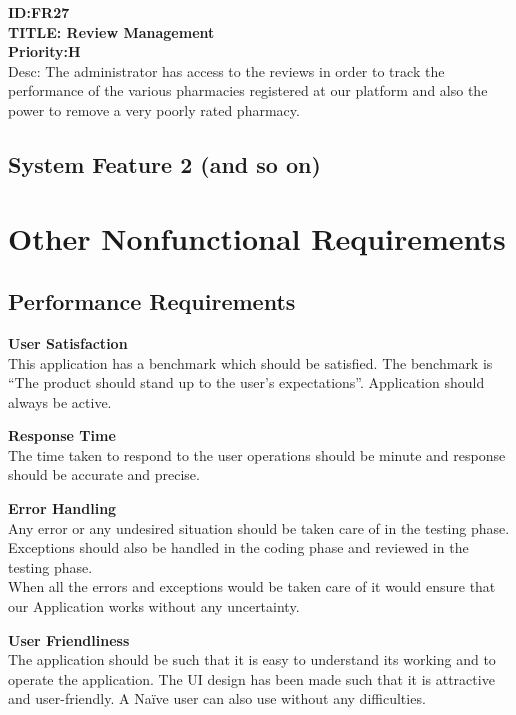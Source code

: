 \documentclass{scrreprt}
\begin{document}
\textbf{ID:FR27}  \\
\textbf{TITLE: Review Management}  \\
\textbf{Priority:H}   \\
Desc: The administrator has access to the reviews in order to track the performance of the various pharmacies registered at our platform and also the power to remove  a very poorly rated pharmacy.		 \\


\section{System Feature 2 (and so on)}


\chapter{Other Nonfunctional Requirements}

\section{Performance Requirements}

\item \textbf{User Satisfaction}   \\
This application has a benchmark which should be satisfied. The benchmark is “The product should stand up to the user’s expectations”. Application should always be active.  \\

\item \textbf{Response Time}  \\
The time taken to respond to the user operations should be minute and response should be accurate and precise. \\

\item \textbf{Error Handling}  \\
	Any error or any undesired situation should be taken care of in the testing phase.  \\
Exceptions should also be handled in the coding phase and reviewed in the testing phase.  \\
When all the errors and exceptions would be taken care of it would ensure that our 
Application works without any uncertainty.  \\

\item \textbf{User Friendliness} \\ 
The application should be such that it is easy to understand its working and to operate the application. The UI design has been made such that it is attractive and user-friendly. A Naïve user can also use without any difficulties. \\
\end{document}
